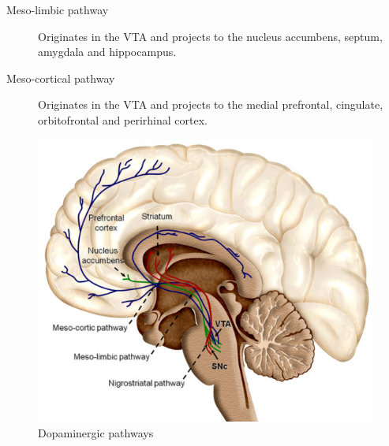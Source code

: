 \begin{description}
\begin{description}
            \item[Meso-limbic pathway] 
                Originates in the VTA and projects to the nucleus accumbens, septum, amygdala and hippocampus.

            \item[Meso-cortical pathway] 
                Originates in the VTA and projects to the medial prefrontal, cingulate, orbitofrontal and perirhinal cortex.
        \end{description}

        \begin{figure}[H]
            \centering
            \includegraphics[width=0.3\linewidth]{./img/dopaminergic_pathways.png}
            \caption{Dopaminergic pathways}
        \end{figure}
\end{description}